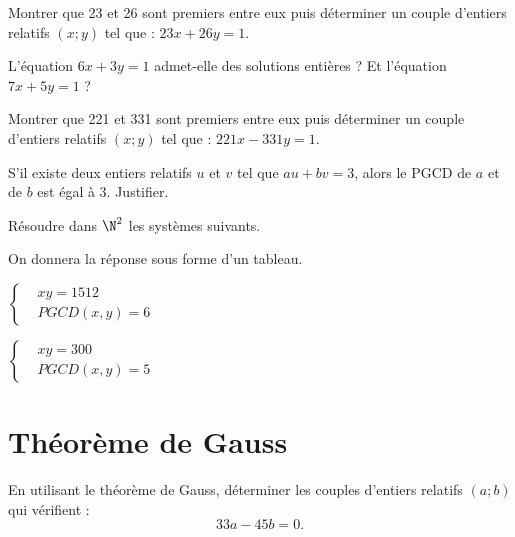 \documentclass{cornouaille}
\begin{document}
\begin{exercice}
Montrer que 23 et 26 sont premiers entre eux puis déterminer un couple d'entiers relatifs $(x;y)$ tel que : $23x + 26y = 1$.
\end{exercice}

\begin{exercice}
L'équation $6x + 3y = 1$ admet-elle des solutions entières ? Et l'équation $7x + 5y = 1$ ?
\end{exercice}

\begin{exercice}
  Montrer que 221 et 331 sont premiers entre eux puis déterminer un
  couple d'entiers relatifs $(x;y)$ tel que : $221x - 331y = 1$.
\end{exercice}

\begin{exercice}
  S'il existe deux entiers relatifs $u$ et $v$ tel que $au + bv = 3$,
  alors le PGCD de $a$ et de $b$ est égal à 3. Justifier.
\end{exercice}

\begin{exercice}
  Résoudre dans $\N^2$ les systèmes suivants. 

  On donnera la réponse sous forme d'un tableau.
\begin{colenumerate}{2}
\item $\left\{\begin{aligned}
					&xy=1512\\
					&PGCD(x,y)=6\end{aligned}\right.$
\item $\left\{\begin{aligned}
					&xy=300\\
					&PGCD(x,y)=5\end{aligned}\right.$
\end{colenumerate}
\end{exercice}



\section{Théorème de Gauss}

\begin{exercice}
En utilisant le théorème de Gauss, déterminer les couples d'entiers relatifs $(a;b)$ qui vérifient :
$$33a - 45b = 0.$$
\end{exercice}
\end{document}
